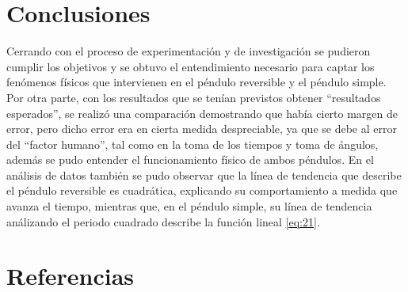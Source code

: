 \documentclass[spanish,notitlepage,letterpaper, 12pt]{article}
\begin{document}
\section{Conclusiones}
Cerrando con el proceso de experimentación y de investigación se pudieron cumplir los objetivos y se obtuvo el entendimiento necesario para captar los fenómenos físicos que intervienen en el  péndulo reversible y el péndulo simple. Por otra parte, con los resultados que se tenían previstos obtener “resultados esperados”, se realizó una comparación demostrando que había cierto margen de error, pero dicho error era en cierta medida despreciable, ya que se debe al error del “factor humano”, tal como en la toma de los tiempos y toma de ángulos, además se pudo entender el funcionamiento físico de ambos péndulos. En el análisis de datos también se pudo observar que la línea de tendencia que describe el péndulo reversible es cuadrática, explicando su comportamiento a medida que avanza el tiempo, mientras que, en el péndulo simple, su línea de tendencia análizando el periodo cuadrado describe la función lineal \eqref{eq:21}.

\section{Referencias} 


\end{document}
